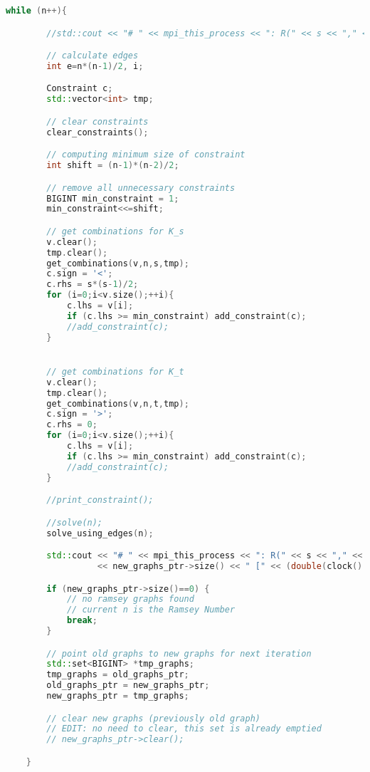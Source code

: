 \documentclass[12pt]{etsu_thesis}
\begin{document}
\begin{lstlisting}[language=C++]
    while (n++){

        //std::cout << "# " << mpi_this_process << ": R(" << s << "," << t << "," << n << ") = " << std::flush;

        // calculate edges
        int e=n*(n-1)/2, i;

        Constraint c;
        std::vector<int> tmp;

        // clear constraints
        clear_constraints();

        // computing minimum size of constraint
        int shift = (n-1)*(n-2)/2;

        // remove all unnecessary constraints
        BIGINT min_constraint = 1;
        min_constraint<<=shift;

        // get combinations for K_s 
        v.clear();
        tmp.clear();    
        get_combinations(v,n,s,tmp);
        c.sign = '<';
        c.rhs = s*(s-1)/2;        
        for (i=0;i<v.size();++i){
            c.lhs = v[i];
            if (c.lhs >= min_constraint) add_constraint(c);
            //add_constraint(c);
        }


        // get combinations for K_t 
        v.clear();
        tmp.clear();
        get_combinations(v,n,t,tmp);
        c.sign = '>';
        c.rhs = 0;
        for (i=0;i<v.size();++i){
            c.lhs = v[i];
            if (c.lhs >= min_constraint) add_constraint(c);
            //add_constraint(c);
        }

        //print_constraint();

        //solve(n);
        solve_using_edges(n);

        std::cout << "# " << mpi_this_process << ": R(" << s << "," << t << "," << n << ") = " 
                  << new_graphs_ptr->size() << " [" << (double(clock() - begin) / CLOCKS_PER_SEC) << "s]" << std::endl;

        if (new_graphs_ptr->size()==0) {
            // no ramsey graphs found
            // current n is the Ramsey Number
            break;
        }

        // point old graphs to new graphs for next iteration
        std::set<BIGINT> *tmp_graphs;
        tmp_graphs = old_graphs_ptr;
        old_graphs_ptr = new_graphs_ptr;
        new_graphs_ptr = tmp_graphs;

        // clear new graphs (previously old graph)
        // EDIT: no need to clear, this set is already emptied
        // new_graphs_ptr->clear();

    }


\end{lstlisting}
\end{document}
